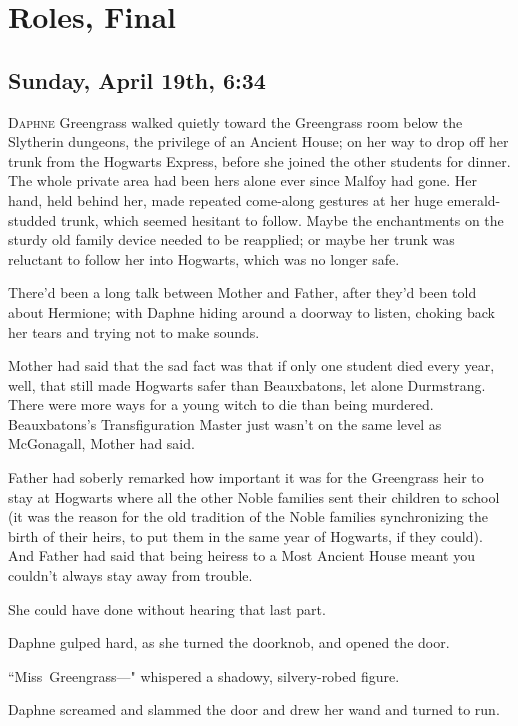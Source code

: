 \chapter{Roles, Final}

\section{Sunday, April 19th, 6:34\pm}

\lettrine{D}{aphne} Greengrass walked quietly toward the Greengrass room below the Slytherin dungeons, the privilege of an Ancient House; on her way to drop off her trunk from the Hogwarts Express, before she joined the other students for dinner. The whole private area had been hers alone ever since Malfoy had gone. Her hand, held behind her, made repeated come-along gestures at her huge emerald-studded trunk, which seemed hesitant to follow. Maybe the enchantments on the sturdy old family device needed to be reapplied; or maybe her trunk was reluctant to follow her into Hogwarts, which was no longer safe.

There'd been a long talk between Mother and Father, after they'd been told about Hermione; with Daphne hiding around a doorway to listen, choking back her tears and trying not to make sounds.

Mother had said that the sad fact was that if only one student died every year, well, that still made Hogwarts safer than Beauxbatons, let alone Durmstrang. There were more ways for a young witch to die than being murdered. Beauxbatons's Transfiguration Master just wasn't on the same level as McGonagall, Mother had said.

Father had soberly remarked how important it was for the Greengrass heir to stay at Hogwarts where all the other Noble families sent their children to school (it was the reason for the old tradition of the Noble families synchronizing the birth of their heirs, to put them in the same year of Hogwarts, if they could). And Father had said that being heiress to a Most Ancient House meant you couldn't always stay away from trouble.

She could have done without hearing that last part.

Daphne gulped hard, as she turned the doorknob, and opened the door.

``Miss~Greengrass—" whispered a shadowy, silvery-robed figure.

Daphne screamed and slammed the door and drew her wand and turned to run.

